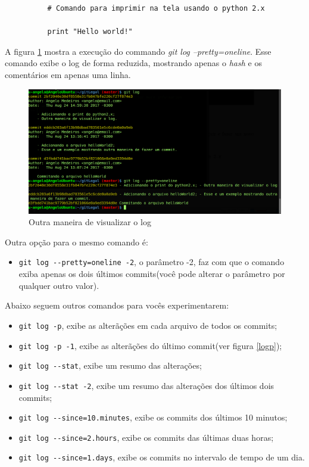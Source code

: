 \documentclass[12pt,openright,oneside,a4paper,english,brazil]{abntex2}
\begin{document}
\begin{verbatim}
          # Comando para imprimir na tela usando o python 2.x 
                   
          print "Hello world!"
\end{verbatim}

A figura \ref{pretty} mostra a execução do commando \textit{git log --pretty=oneline}. Esse comando exibe o log de forma reduzida, mostrando apenas o \textit{hash} e os comentários em apenas uma linha.

\begin{figure}[h]
	\caption{\label{pretty}Outra maneira de visualizar o log}
	\begin{center}
		\includegraphics[width=1\linewidth]{pretty}
	\end{center}
\end{figure}

Outra opção para o mesmo comando é:

\begin{itemize}
	\item \verb|git log --pretty=oneline -2|, o parâmetro -2, faz com que o comando exiba apenas os dois últimos commits(você pode alterar o parâmetro por qualquer outro valor).
\end{itemize}

Abaixo seguem outros comandos para vocês experimentarem:

\begin{itemize}
	\item \verb|git log -p|, exibe as alterãções em cada arquivo de todos os commits;
	\item \verb|git log -p -1|, exibe as alterãções do último commit(ver figura \ref{logp});
	\item \verb|git log --stat|, exibe um resumo das alterações;
	\item \verb|git log --stat -2|, exibe um resumo das alterações dos últimos dois commits;
	\item \verb|git log --since=10.minutes|, exibe os commits dos últimos 10 minutos;
	\item \verb|git log --since=2.hours|, exibe os commits das últimas duas horas;
	\item \verb|git log --since=1.days|, exibe os commits no intervalo de tempo de um dia.
\end{itemize}
\end{document}
